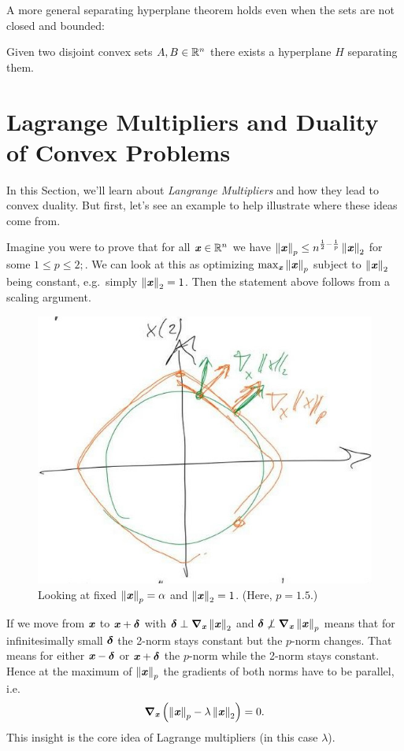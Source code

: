 A more general separating hyperplane theorem holds even when the sets
are not closed and bounded:

\begin{theorem} \label{th:sht}
Given two disjoint convex sets $A, B \in \mathbb{R}^n$ there exists a hyperplane $H$
separating them.
\end{theorem}


\section{Lagrange Multipliers and Duality of Convex Problems}

In this Section, we'll learn about \emph{Langrange Multipliers} and
how they lead to convex duality.
But first, let's see an example to help illustrate where these ideas
come from.

Imagine you were to prove that for all $\boldsymbol{\mathit{x}} \in \mathbb{R}^n$ we have $\left\| \boldsymbol{\mathit{x}} \right\|_p \leq n^{\frac{1}{2} - \frac{1}{p}}\left\| \boldsymbol{\mathit{x}} \right\|_2$ for some $1 \leq p \leq 2;$.
We can look at this as optimizing $\max_{\boldsymbol{\mathit{x}}} \left\| \boldsymbol{\mathit{x}} \right\|_p$ subject to $\left\| \boldsymbol{\mathit{x}} \right\|_2$ being constant, e.g.\ simply $\left\| \boldsymbol{\mathit{x}} \right\|_2 = 1$. Then the statement above follows from a scaling argument.

\begin{figure}[ht]
  \centering
  \includegraphics[width=.48\textwidth]{fig/lec12-2p-norms.jpeg}
  \caption{Looking at fixed $\left\| \boldsymbol{\mathit{x}} \right\|_p = \alpha$ and $\left\| \boldsymbol{\mathit{x}} \right\|_2=1$. (Here, $p = 1.5$.)}
  \label{fig:2-p-norm}
\end{figure}

If we move from $\boldsymbol{\mathit{x}}$ to $\boldsymbol{\mathit{x}} + \boldsymbol{\delta}$ with $\boldsymbol{\delta} \perp \boldsymbol{\nabla}_{\boldsymbol{\mathit{x}}}\left\| \boldsymbol{\mathit{x}} \right\|_2$ and $\boldsymbol{\delta} \not\perp \boldsymbol{\nabla}_{\boldsymbol{\mathit{x}}}\left\| \boldsymbol{\mathit{x}} \right\|_p$ means that for infinitesimally small $\boldsymbol{\delta}$ the 2-norm stays constant but the $p$-norm changes.
That means for either $\boldsymbol{\mathit{x}} - \boldsymbol{\delta}$ or $\boldsymbol{\mathit{x}} + \boldsymbol{\delta}$ the $p$-norm
while the 2-norm stays constant. Hence at the maximum of $\left\| \boldsymbol{\mathit{x}} \right\|_p$ the gradients of both norms have to be parallel, i.e.~\begin{equation*}\boldsymbol{\nabla}_{\boldsymbol{\mathit{x}}}\left(\left\| \boldsymbol{\mathit{x}} \right\|_p - \lambda\left\| \boldsymbol{\mathit{x}} \right\|_2\right) = 0.\end{equation*}
This insight is the core idea of Lagrange multipliers (in this case $\lambda$).

